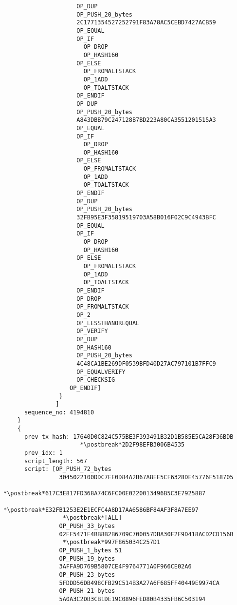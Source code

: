 \begin{lstlisting}
                     OP_DUP
                     OP_PUSH_20_bytes
                     2C1771354527252791F83A78AC5CEBD7427ACB59
                     OP_EQUAL
                     OP_IF
                       OP_DROP
                       OP_HASH160
                     OP_ELSE
                       OP_FROMALTSTACK
                       OP_1ADD
                       OP_TOALTSTACK
                     OP_ENDIF
                     OP_DUP
                     OP_PUSH_20_bytes
                     A843DBB79C247128B7BD223A80CA3551201515A3
                     OP_EQUAL
                     OP_IF
                       OP_DROP
                       OP_HASH160
                     OP_ELSE
                       OP_FROMALTSTACK
                       OP_1ADD
                       OP_TOALTSTACK
                     OP_ENDIF
                     OP_DUP
                     OP_PUSH_20_bytes
                     32FB95E3F35819519703A58B016F02C9C4943BFC
                     OP_EQUAL
                     OP_IF
                       OP_DROP
                       OP_HASH160
                     OP_ELSE
                       OP_FROMALTSTACK
                       OP_1ADD
                       OP_TOALTSTACK
                     OP_ENDIF
                     OP_DROP
                     OP_FROMALTSTACK
                     OP_2
                     OP_LESSTHANOREQUAL
                     OP_VERIFY
                     OP_DUP
                     OP_HASH160
                     OP_PUSH_20_bytes
                     4C48CA1BE269DF0539BFD40D27AC797101B7FFC9
                     OP_EQUALVERIFY
                     OP_CHECKSIG
                   OP_ENDIF]
                }
               ]
      sequence_no: 4194810
    }
    {
      prev_tx_hash: 17640D0C824C575BE3F393491B32D1B585E5CA28F36BDB
                      *\postbreak*2D2F98EFB3006B4535
      prev_idx: 1
      script_length: 567
      script: [OP_PUSH_72_bytes
                3045022100DDC7EE0D84A2B67A8EE5CF6328DE45776F518705
                 *\postbreak*617C3E817FD368A74C6FC00E0220013496B5C3E7925887
                 *\postbreak*E32FB1253E2E1ECFC4A8D17AA6586BF84AF3F8A7EE97
                 *\postbreak*[ALL]
                OP_PUSH_33_bytes
                02EF5471E4BB8B2B6709C700057DBA30F2F9D418ACD2CD156B
                 *\postbreak*997F865034C257D1
                OP_PUSH_1_bytes 51
                OP_PUSH_19_bytes
                3AFFA9D769B5807CE4F9764771A0F966CE02A6
                OP_PUSH_23_bytes
                5FDDD56DB498CFB29C514B3A27A6F685FF40449E9974CA
                OP_PUSH_21_bytes
                5A0A3C2DB3CB1DE19C0896FED80B4335FB6C503194

\end{lstlisting}
